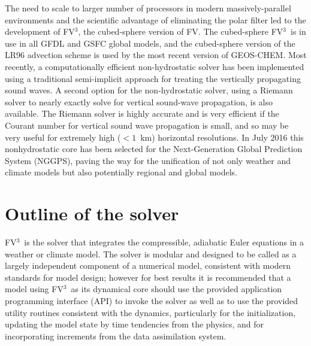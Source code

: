 \documentclass[12pt,letterpaper]{book}
\newcommand{\fv}{FV$^{\mathrm{3}}$}
\begin{document}
The need to scale to larger number of processors in modern massively-parallel environments and the scientific advantage of eliminating the polar filter led to the development of \fv, the cubed-sphere version of FV. The cubed-sphere \fv\ is in use in all GFDL and GSFC global models, and the cubed-sphere version of the LR96 advection scheme is used by the most recent version of GEOS-CHEM. Most recently, a computationally efficient non-hydrostatic solver has been implemented using a traditional semi-implicit approach for treating the vertically propagating sound waves. A second option for the non-hydrostatic solver, using a Riemann solver to nearly exactly solve for vertical sound-wave propagation, is also available. The Riemann solver is highly accurate and is very efficient if the Courant number for vertical sound wave propagation is small, and so may be very useful for extremely high ($<1$~km) horizontal resolutions. In July 2016 this nonhydrostatic core has been selected for the Next-Generation Global Prediction System (NGGPS), paving the way for the unification of not only weather and climate models but also potentially regional and global models.

\section{Outline of the solver}

\fv\ is the solver that integrates the compressible, adiabatic Euler equations in a weather or climate model. The solver is modular and designed to be called as a largely independent component of a numerical model, consistent with modern standards for model design; however for best results it is recommended that a model using \fv\ as its dynamical core should use the provided application programming interface (API) to invoke the solver as well as to use the provided utility routines consistent with the dynamics, particularly for the initialization, updating the model state by time tendencies from the physics, and for incorporating increments from the data assimilation system. 
\end{document}
